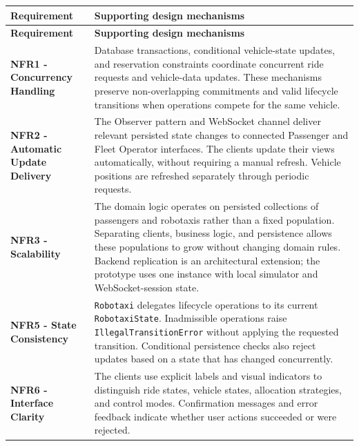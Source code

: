 \documentclass[11pt,a4paper,oneside]{report}
\newcommand{\code}[1]{\texttt{#1}}
\begin{document}
\begin{longtable}{@{}
    >{\raggedright\arraybackslash}p{}
    >{\raggedright\arraybackslash}p{}
@{}}
\toprule
\textbf{Requirement} & \textbf{Supporting design mechanisms} \\
\midrule
\endfirsthead

\toprule
\textbf{Requirement} & \textbf{Supporting design mechanisms} \\
\midrule
\endhead

\bottomrule
\endlastfoot

\textbf{NFR1 - Concurrency Handling}
&
Database transactions, conditional vehicle-state updates, and
reservation constraints coordinate concurrent ride requests and
vehicle-data updates. These mechanisms preserve non-overlapping
commitments and valid lifecycle transitions when operations compete
for the same vehicle.
\\

\textbf{NFR2 - Automatic Update Delivery}
&
The Observer pattern and WebSocket channel deliver relevant persisted
state changes to connected Passenger and Fleet Operator interfaces.
The clients update their views automatically, without requiring a
manual refresh. Vehicle positions are refreshed separately through
periodic requests.
\\

\textbf{NFR3 - Scalability}
&
The domain logic operates on persisted collections of passengers and
robotaxis rather than a fixed population. Separating clients, business
logic, and persistence allows these populations to grow without
changing domain rules. Backend replication is an architectural
extension; the prototype uses one instance with local simulator and
WebSocket-session state.
\\

\textbf{NFR5 - State Consistency}
&
\code{Robotaxi} delegates lifecycle operations to its current
\code{RobotaxiState}. Inadmissible operations raise
\code{IllegalTransitionError} without applying the requested transition.
Conditional persistence checks also reject updates based on a state
that has changed concurrently.
\\

\textbf{NFR6 - Interface Clarity}
&
The clients use explicit labels and visual indicators to distinguish
ride states, vehicle states, allocation strategies, and control modes.
Confirmation messages and error feedback indicate whether user
actions succeeded or were rejected.
\\


\end{longtable}
\end{document}

